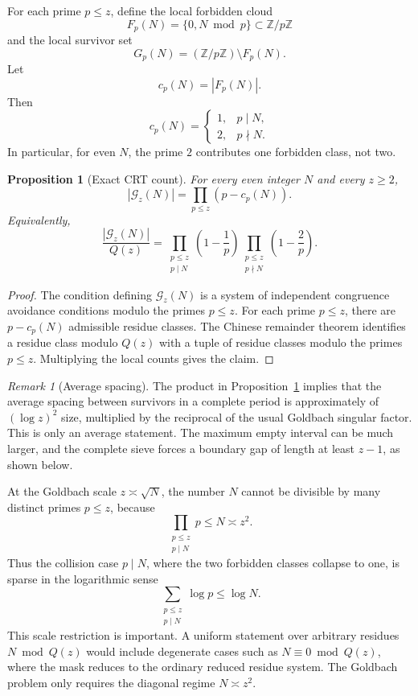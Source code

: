 \documentclass[11pt]{article}
\theoremstyle{plain}
\newtheorem{proposition}[theorem]{Proposition}
\theoremstyle{definition}
\theoremstyle{remark}
\newtheorem{remark}[theorem]{Remark}
\newcommand{\Z}{\mathbb Z}
\newcommand{\G}{\mathcal G}
\begin{document}
For each prime \(p\le z\), define the local forbidden cloud
\[
F_p(N)=\{0,N\bmod p\}\subset\Z/p\Z
\]
and the local survivor set
\[
G_p(N)=(\Z/p\Z)\setminus F_p(N).
\]
Let
\[
c_p(N)=|F_p(N)|.
\]
Then
\[
c_p(N)=
\begin{cases}
1,&p\mid N,\\
2,&p\nmid N.
\end{cases}
\]
In particular, for even \(N\), the prime \(2\) contributes one forbidden class,
not two.

\begin{proposition}[Exact CRT count]
\label{prop:crt_count}
For every even integer \(N\) and every \(z\ge2\),
\[
|\G_z(N)|=\prod_{p\le z}(p-c_p(N)).
\]
Equivalently,
\[
\frac{|\G_z(N)|}{Q(z)}
=
\prod_{\substack{p\le z\\p\mid N}}\left(1-\frac1p\right)
\prod_{\substack{p\le z\\p\nmid N}}\left(1-\frac2p\right).
\]
\end{proposition}

\begin{proof}
The condition defining \(\G_z(N)\) is a system of independent congruence
avoidance conditions modulo the primes \(p\le z\).  For each prime \(p\le z\),
there are \(p-c_p(N)\) admissible residue classes.  The Chinese remainder
theorem identifies a residue class modulo \(Q(z)\) with a tuple of residue
classes modulo the primes \(p\le z\).  Multiplying the local counts gives the
claim.
\end{proof}

\begin{remark}[Average spacing]
The product in Proposition~\ref{prop:crt_count} implies that the average
spacing between survivors in a complete period is approximately of
\((\log z)^2\) size, multiplied by the reciprocal of the usual Goldbach singular
factor.  This is only an average statement.  The maximum empty interval can be
much larger, and the complete sieve forces a boundary gap of length at least
\(z-1\), as shown below.
\end{remark}

At the Goldbach scale \(z\asymp\sqrt N\), the number \(N\) cannot be divisible by
many distinct primes \(p\le z\), because
\[
\prod_{\substack{p\le z\\p\mid N}}p\le N\asymp z^2.
\]
Thus the collision case \(p\mid N\), where the two forbidden classes collapse to
one, is sparse in the logarithmic sense
\[
\sum_{\substack{p\le z\\p\mid N}}\log p\le \log N.
\]
This scale restriction is important.  A uniform statement over arbitrary
residues \(N\bmod Q(z)\) would include degenerate cases such as
\(N\equiv0\bmod Q(z)\), where the mask reduces to the ordinary reduced residue
system.  The Goldbach problem only requires the diagonal regime
\(N\asymp z^2\).
\end{document}
